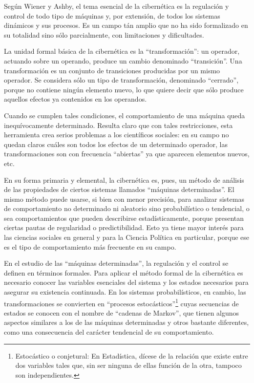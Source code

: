 \documentclass[
]{book}
\begin{document}
Según Wiener y Ashby, el tema esencial de la cibernética es la regulación y control de todo tipo de máquinas y, por extensión, de todos los sistemas dinámicos y sus procesos. Es un campo tán amplio que no ha sido formalizado en su totalidad sino sólo parcialmente, con limitaciones y dificultades.

La unidad formal básica de la cibernética es la ``transformación'': un operador, actuando sobre un operando, produce un cambio denominado ``transición''. Una transformación es un conjunto de transiciones producidas por un mismo operador. Se considera sólo un tipo de transformación, denominado ``cerrado'', porque no contiene ningún elemento nuevo, lo que quiere decir que sólo produce aquellos efectos ya contenidos en los operandos.

Cuando se cumplen tales condiciones, el comportamiento de una máquina queda inequívocamente determinado. Resulta claro que con tales restricciones, esta herramienta crea serios problemas a los científicos sociales: en su campo no quedan claros cuáles son todos los efectos de un determinado operador, las transformaciones son con frecuencia ``abiertas'' ya que aparecen elementos nuevos, etc.

En su forma primaria y elemental, la cibernética es, pues, un método de análisis de las propiedades de ciertos sistemas llamados ``máquinas determinadas''. El mismo método puede usarse, si bien con menor precisión, para analizar sistemas de comportamiento no determinado ni aleatorio sino probabilístico o tendencial, o sea comportamientos que pueden describirse estadísticamente, porque presentan ciertas pautas de regularidad o predictibilidad. Esto ya tiene mayor interés para las ciencias sociales en general y para la Ciencia Política en particular, porque ese es el tipo de comportamiento más frecuente en su campo.

En el estudio de las ``máquinas determinadas'', la regulación y el control se definen en términos formales. Para aplicar el método formal de la cibernética es necesario conocer las variables esenciales del sistema y los estados necesarios para asegurar su existencia continuada. En los sistemas probabilísticos, en cambio, las transformaciones se convierten en ``procesos estocásticos''\footnote{Estocástico o conjetural: En Estadística, dícese de la relación que existe entre dos variables tales que, sin ser ninguna de ellas función de la otra, tampoco son independientes.} cuyas secuencias de estados se conocen con el nombre de ``cadenas de Markov'', que tienen algunos aspectos similares a los de las máquinas determinadas y otros bastante diferentes, como una consecuencia del carácter tendencial de su comportamiento.
\end{document}
